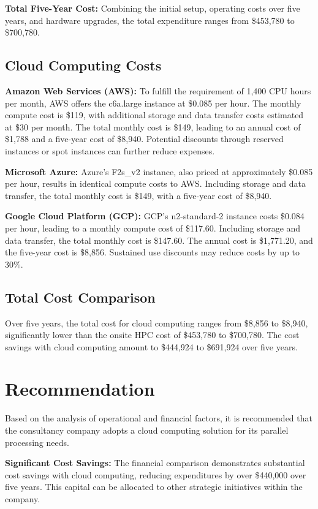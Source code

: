 \documentclass{article}
\begin{document}
\textbf{Total Five-Year Cost:}
Combining the initial setup, operating costs over five years, and hardware upgrades, the total expenditure ranges from \$453,780 to \$700,780.

\subsection{Cloud Computing Costs}
\textbf{Amazon Web Services (AWS):}
To fulfill the requirement of 1,400 CPU hours per month, AWS offers the c6a.large instance at \$0.085 per hour. The monthly compute cost is \$119, with additional storage and data transfer costs estimated at \$30 per month. The total monthly cost is \$149, leading to an annual cost of \$1,788 and a five-year cost of \$8,940. Potential discounts through reserved instances or spot instances can further reduce expenses.

\textbf{Microsoft Azure:}
Azure's F2s\_v2 instance, also priced at approximately \$0.085 per hour, results in identical compute costs to AWS. Including storage and data transfer, the total monthly cost is \$149, with a five-year cost of \$8,940.

\textbf{Google Cloud Platform (GCP):}
GCP's n2-standard-2 instance costs \$0.084 per hour, leading to a monthly compute cost of \$117.60. Including storage and data transfer, the total monthly cost is \$147.60. The annual cost is \$1,771.20, and the five-year cost is \$8,856. Sustained use discounts may reduce costs by up to 30\%.

\subsection{Total Cost Comparison}
Over five years, the total cost for cloud computing ranges from \$8,856 to \$8,940, significantly lower than the onsite HPC cost of \$453,780 to \$700,780. The cost savings with cloud computing amount to \$444,924 to \$691,924 over five years.

\section{Recommendation}

Based on the analysis of operational and financial factors, it is recommended that the consultancy company adopts a cloud computing solution for its parallel processing needs.

\textbf{Significant Cost Savings:} The financial comparison demonstrates substantial cost savings with cloud computing, reducing expenditures by over \$440,000 over five years. This capital can be allocated to other strategic initiatives within the company.
\end{document}
